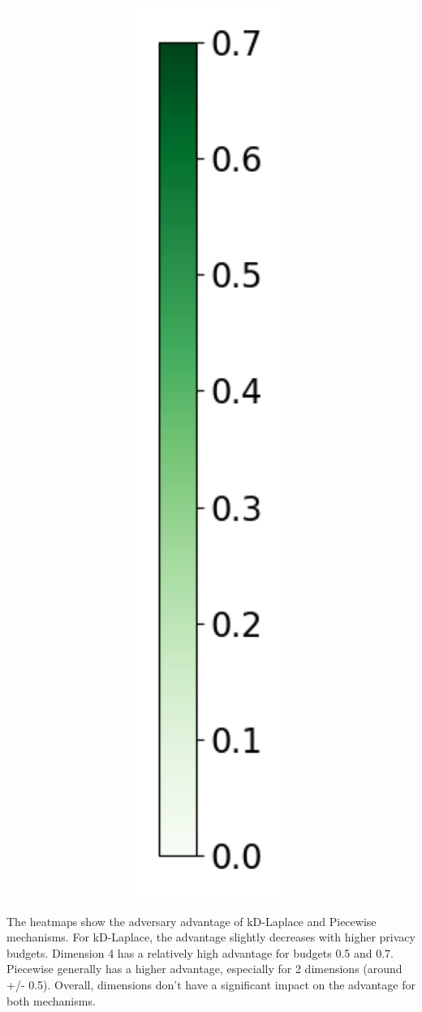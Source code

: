\begin{figure}[H]
\begin{subfigure}[b]{0.075\textwidth}
    \includegraphics[width=1\textwidth]{Results/kd-laplace/kd-Laplace/seeds-dataset/heatmap_legend_shokri_mi_adv.png}
  \end{subfigure}
\end{figure}
The heatmaps show the adversary advantage of kD-Laplace and Piecewise mechanisms.
For kD-Laplace, the advantage slightly decreases with higher privacy budgets.
Dimension 4 has a relatively high advantage for budgets 0.5 and 0.7. Piecewise generally has a higher advantage, especially for 2 dimensions (around +/- 0.5).
Overall, dimensions don't have a significant impact on the advantage for both mechanisms.
\newpage
